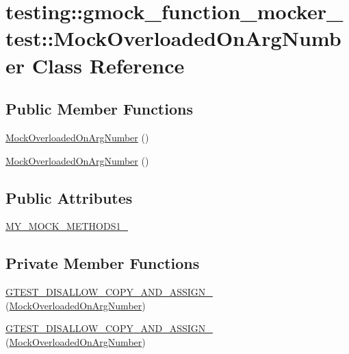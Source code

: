 \hypertarget{classtesting_1_1gmock__function__mocker__test_1_1_mock_overloaded_on_arg_number}{}\section{testing\+::gmock\+\_\+function\+\_\+mocker\+\_\+test\+::Mock\+Overloaded\+On\+Arg\+Number Class Reference}
\label{classtesting_1_1gmock__function__mocker__test_1_1_mock_overloaded_on_arg_number}
\subsection*{Public Member Functions}
\begin{DoxyCompactItemize}
\item 
\mbox{\hyperlink{classtesting_1_1gmock__function__mocker__test_1_1_mock_overloaded_on_arg_number_a3bb5bd2f0cb88c50b20a13b6f88ce01d}{Mock\+Overloaded\+On\+Arg\+Number}} ()
\item 
\mbox{\hyperlink{classtesting_1_1gmock__function__mocker__test_1_1_mock_overloaded_on_arg_number_a3bb5bd2f0cb88c50b20a13b6f88ce01d}{Mock\+Overloaded\+On\+Arg\+Number}} ()
\end{DoxyCompactItemize}
\subsection*{Public Attributes}
\begin{DoxyCompactItemize}
\item 
\mbox{\hyperlink{classtesting_1_1gmock__function__mocker__test_1_1_mock_overloaded_on_arg_number_a251bfa5d95ae7a52ccfc9b541fac2ea5}{M\+Y\+\_\+\+M\+O\+C\+K\+\_\+\+M\+E\+T\+H\+O\+D\+S1\+\_\+}}
\end{DoxyCompactItemize}
\subsection*{Private Member Functions}
\begin{DoxyCompactItemize}
\item 
\mbox{\hyperlink{classtesting_1_1gmock__function__mocker__test_1_1_mock_overloaded_on_arg_number_a31dbf297a85485026c70a8745f4744af}{G\+T\+E\+S\+T\+\_\+\+D\+I\+S\+A\+L\+L\+O\+W\+\_\+\+C\+O\+P\+Y\+\_\+\+A\+N\+D\+\_\+\+A\+S\+S\+I\+G\+N\+\_\+}} (\mbox{\hyperlink{classtesting_1_1gmock__function__mocker__test_1_1_mock_overloaded_on_arg_number}{Mock\+Overloaded\+On\+Arg\+Number}})
\item 
\mbox{\hyperlink{classtesting_1_1gmock__function__mocker__test_1_1_mock_overloaded_on_arg_number_a31dbf297a85485026c70a8745f4744af}{G\+T\+E\+S\+T\+\_\+\+D\+I\+S\+A\+L\+L\+O\+W\+\_\+\+C\+O\+P\+Y\+\_\+\+A\+N\+D\+\_\+\+A\+S\+S\+I\+G\+N\+\_\+}} (\mbox{\hyperlink{classtesting_1_1gmock__function__mocker__test_1_1_mock_overloaded_on_arg_number}{Mock\+Overloaded\+On\+Arg\+Number}})
\end{DoxyCompactItemize}


